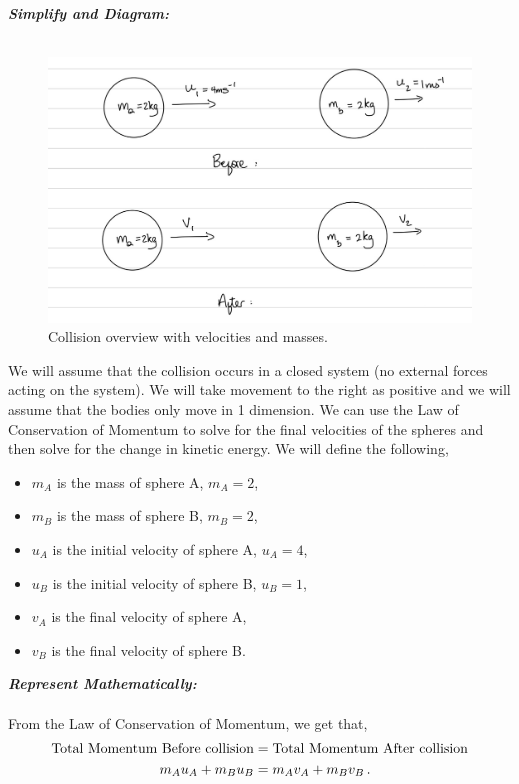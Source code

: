 \begin{subquestions}
\begin{subsubquestions}
\textbf{\textit{Simplify and Diagram:}} \\ \\
\begin{figure}[H]
	\begin{center}
		\includegraphics[scale=0.25]{../2007/figures/2008Mq5-1}
		\caption{\label{2008M:q5:Diagram1} Collision overview with velocities and masses.}
	\end{center}
\end{figure}
We will assume that the collision occurs in a closed system (no external forces acting on the system). We will take movement to the right as positive and we will assume that the bodies only move in 1 dimension. We can use the Law of Conservation of Momentum to solve for the final velocities of the spheres and then solve for the change in kinetic energy. We will define the following,
\begin{itemize}
	\item $m_A$ is the mass of sphere A, $m_A=2$,
	\item $m_B$ is the mass of sphere B, $m_B=2$,
	\item $u_A$ is the initial velocity of sphere A, $u_A=4$,
	\item $u_B$ is the initial velocity of sphere B, $u_B=1$,
	\item $v_A$ is the final velocity of sphere A,
	\item $v_B$ is the final velocity of sphere B.
\end{itemize}




\textbf{\textit{Represent Mathematically:}} \\ \\
From the Law of Conservation of Momentum, we get that,
\begin{align}
	\text{Total Momentum Before collision} & = \text{Total Momentum After collision} \nonumber \\
	m_Au_A + m_Bu_B & = m_Av_A+m_Bv_B \label{2008M:q5:MomEqn1}\,.
\end{align}


\end{subsubquestions}
\end{subquestions}
